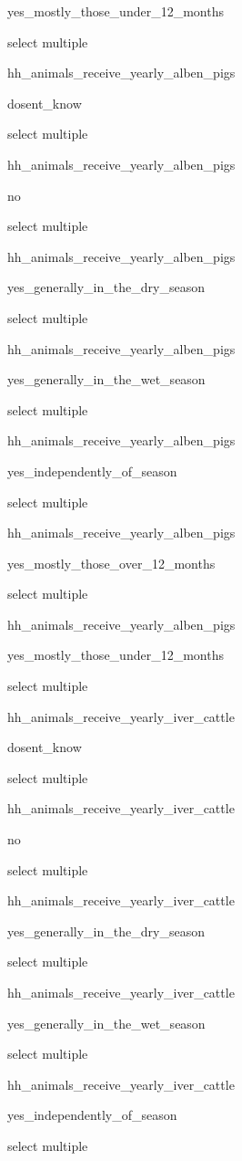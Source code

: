\documentclass[]{article}
\begin{document}
yes\_mostly\_those\_under\_12\_months

select multiple

hh\_animals\_receive\_yearly\_alben\_pigs

dosent\_know

select multiple

hh\_animals\_receive\_yearly\_alben\_pigs

no

select multiple

hh\_animals\_receive\_yearly\_alben\_pigs

yes\_generally\_in\_the\_dry\_season

select multiple

hh\_animals\_receive\_yearly\_alben\_pigs

yes\_generally\_in\_the\_wet\_season

select multiple

hh\_animals\_receive\_yearly\_alben\_pigs

yes\_independently\_of\_season

select multiple

hh\_animals\_receive\_yearly\_alben\_pigs

yes\_mostly\_those\_over\_12\_months

select multiple

hh\_animals\_receive\_yearly\_alben\_pigs

yes\_mostly\_those\_under\_12\_months

select multiple

hh\_animals\_receive\_yearly\_iver\_cattle

dosent\_know

select multiple

hh\_animals\_receive\_yearly\_iver\_cattle

no

select multiple

hh\_animals\_receive\_yearly\_iver\_cattle

yes\_generally\_in\_the\_dry\_season

select multiple

hh\_animals\_receive\_yearly\_iver\_cattle

yes\_generally\_in\_the\_wet\_season

select multiple

hh\_animals\_receive\_yearly\_iver\_cattle

yes\_independently\_of\_season

select multiple
\end{document}
